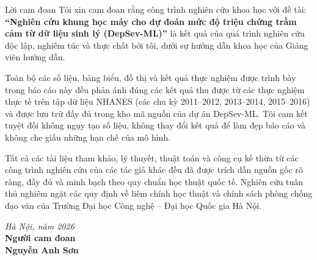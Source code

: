 \documentclass{uetgraduation}
\begin{document}
\begin{preamble}{Lời cam đoan}
Tôi xin cam đoan rằng công trình nghiên cứu khoa học với đề tài: \textbf{“Nghiên cứu khung học máy cho dự đoán mức độ triệu chứng trầm cảm từ dữ liệu sinh lý (DepSev-ML)”} là kết quả của quá trình nghiên cứu độc lập, nghiêm túc và thực chất bởi tôi, dưới sự hướng dẫn khoa học của Giảng viên hướng dẫn.

Toàn bộ các số liệu, bảng biểu, đồ thị và kết quả thực nghiệm được trình bày trong báo cáo này đều phản ánh đúng các kết quả thu được từ các thực nghiệm thực tế trên tập dữ liệu NHANES (các chu kỳ 2011--2012, 2013--2014, 2015--2016) và được lưu trữ đầy đủ trong kho mã nguồn của dự án DepSev-ML. Tôi cam kết tuyệt đối không ngụy tạo số liệu, không thay đổi kết quả để làm đẹp báo cáo và không che giấu những hạn chế của mô hình.

Tất cả các tài liệu tham khảo, lý thuyết, thuật toán và công cụ kế thừa từ các công trình nghiên cứu của các tác giả khác đều đã được trích dẫn nguồn gốc rõ ràng, đầy đủ và minh bạch theo quy chuẩn học thuật quốc tế. Nghiên cứu tuân thủ nghiêm ngặt các quy định về liêm chính học thuật và chính sách phòng chống đạo văn của Trường Đại học Công nghệ -- Đại học Quốc gia Hà Nội.

\vspace{1.5cm}
\begin{flushright}
\textit{Hà Nội, năm 2026}\\[0.2cm]
\textbf{Người cam đoan}\\[1.5cm]
\textbf{Nguyễn Anh Sơn}
\end{flushright}
\end{preamble}
\end{document}
